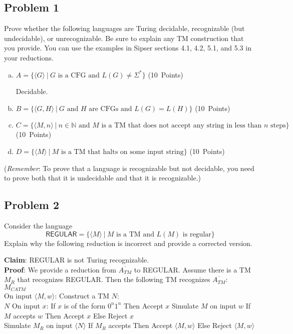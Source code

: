 \documentclass{article}
\begin{document}
\subsection*{Problem 1}

    Prove whether the following languages are Turing decidable, recognizable (but undecidable), or unrecognizable. Be sure to explain any TM construction that you provide. You can use the examples in Sipser sections 4.1, 4.2, 5.1, and 5.3 in your reductions.
    
\begin{enumerate}[(a)]
\item $A = \{ \langle G \rangle ~|~ \text{$G$ is a CFG and } L(G) \neq \Sigma^* \}$ (10~Points)

        Decidable.

\item $B = \{ \langle G, H \rangle ~|~ \text{$G$ and $H$ are CFGs and } L(G) = L(H) \}$ (10~Points)


\item $C = \{ \langle M,n \rangle ~|~ n \in \mathbb{N} \text{ and $M$ is a TM that does not accept any string in less than $n$ steps} \}$ (10~Points)

\item $D = \{ \langle M \rangle ~|~  \text{$M$ is a TM that halts on some input string} \}$ (10~Points)
\end{enumerate}
(\emph{Remember}: To prove that a language is recognizable but not decidable, you need to prove both that it is undecidable and that it is recognizable.)

\newpage
\subsection*{Problem 2}

Consider the language
\[\mathsf{REGULAR} = \{ \langle M \rangle ~|~ \text{$M$ is a TM and $L(M)$ is regular} \} \]  
Explain why the following reduction is incorrect and provide a corrected version.


\textbf{Claim}: \textsf{REGULAR} is not Turing recognizable.\\
\textbf{Proof}: We provide a reduction from $\overline{A_{TM}}$ to \textsf{REGULAR}. Assume there is a TM $M_R$ that recognizes \textsf{REGULAR}. Then the following TM recognizes  $\overline{A_{TM}}$:\\[10pt]
    $M_{CATM}$\\
        On input $\langle M,w \rangle$:
        Construct a TM $N$: \\
        $N$
        On input $x$:
        If $x$ is of the form $0^n1^n$ Then Accept $x$
        Simulate $M$ on input $w$
        If $M$ accepts $w$ Then Accept $x$
        Else Reject $x$  \\
        Simulate $M_R$ on input $\langle N \rangle$
        If $M_R$ accepts Then Accept $\langle M,w \rangle$
        Else Reject $\langle M,w \rangle$
\end{document}
